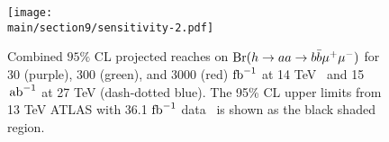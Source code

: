 \begin{figure}[h]
\begin{center}
\texttt{[image: \\main/section9/sensitivity-2.pdf]}
\caption{\small Combined $95\%$ CL projected reaches on ${\mathrm{Br}}(h\to aa \to b\bar{b}\mu^+ \mu^-)$ for 30 (purple), 300 (green), and 3000 (red) ${\rm fb}^{-1}$ at 14 TeV~\cite{Curtin:2014pda} and 15 $\,{\rm ab}^{-1}$ at 27 TeV (dash-dotted blue). The 95\% CL upper limits from  13 TeV ATLAS with 36.1 ${\rm fb}^{-1}$ data~\cite{Aaboud:2018esj} is shown as the black shaded region.}
\label{bbmumu}
\end{center}
\end{figure}
